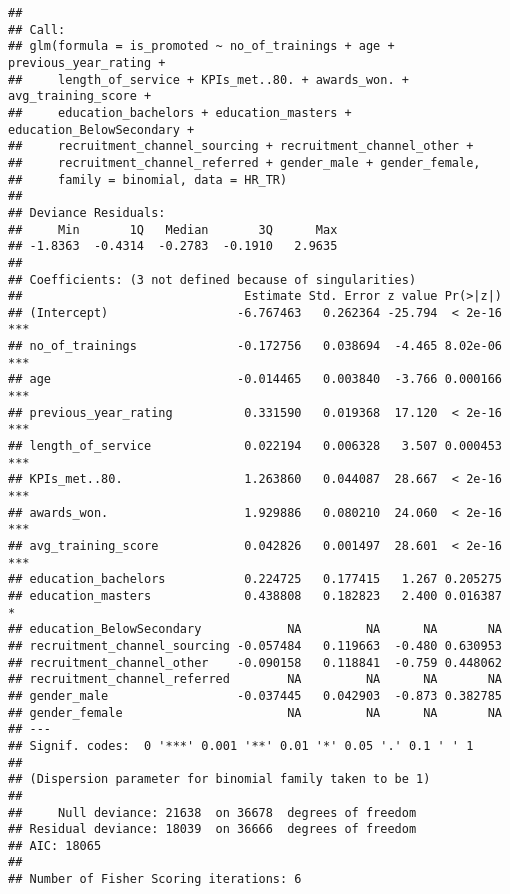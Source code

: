 \documentclass[
]{article}
\begin{document}
\begin{verbatim}
## 
## Call:
## glm(formula = is_promoted ~ no_of_trainings + age + previous_year_rating + 
##     length_of_service + KPIs_met..80. + awards_won. + avg_training_score + 
##     education_bachelors + education_masters + education_BelowSecondary + 
##     recruitment_channel_sourcing + recruitment_channel_other + 
##     recruitment_channel_referred + gender_male + gender_female, 
##     family = binomial, data = HR_TR)
## 
## Deviance Residuals: 
##     Min       1Q   Median       3Q      Max  
## -1.8363  -0.4314  -0.2783  -0.1910   2.9635  
## 
## Coefficients: (3 not defined because of singularities)
##                               Estimate Std. Error z value Pr(>|z|)    
## (Intercept)                  -6.767463   0.262364 -25.794  < 2e-16 ***
## no_of_trainings              -0.172756   0.038694  -4.465 8.02e-06 ***
## age                          -0.014465   0.003840  -3.766 0.000166 ***
## previous_year_rating          0.331590   0.019368  17.120  < 2e-16 ***
## length_of_service             0.022194   0.006328   3.507 0.000453 ***
## KPIs_met..80.                 1.263860   0.044087  28.667  < 2e-16 ***
## awards_won.                   1.929886   0.080210  24.060  < 2e-16 ***
## avg_training_score            0.042826   0.001497  28.601  < 2e-16 ***
## education_bachelors           0.224725   0.177415   1.267 0.205275    
## education_masters             0.438808   0.182823   2.400 0.016387 *  
## education_BelowSecondary            NA         NA      NA       NA    
## recruitment_channel_sourcing -0.057484   0.119663  -0.480 0.630953    
## recruitment_channel_other    -0.090158   0.118841  -0.759 0.448062    
## recruitment_channel_referred        NA         NA      NA       NA    
## gender_male                  -0.037445   0.042903  -0.873 0.382785    
## gender_female                       NA         NA      NA       NA    
## ---
## Signif. codes:  0 '***' 0.001 '**' 0.01 '*' 0.05 '.' 0.1 ' ' 1
## 
## (Dispersion parameter for binomial family taken to be 1)
## 
##     Null deviance: 21638  on 36678  degrees of freedom
## Residual deviance: 18039  on 36666  degrees of freedom
## AIC: 18065
## 
## Number of Fisher Scoring iterations: 6
\end{verbatim}
\end{document}
